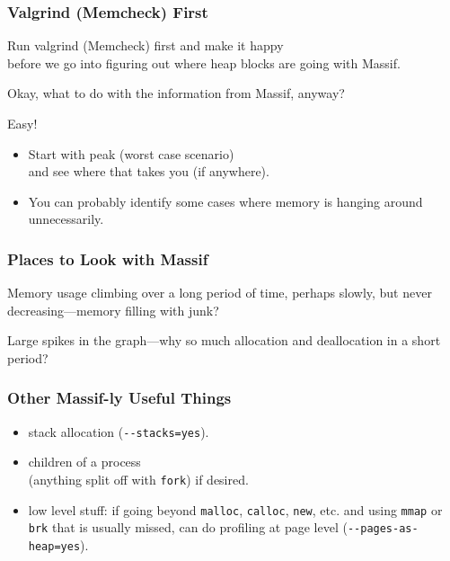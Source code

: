 \begin{frame}
\frametitle{Valgrind (Memcheck) First}

\large
\begin{changemargin}{2cm}
Run valgrind (Memcheck) first and make it happy \\
before we go into figuring out where heap blocks are going with Massif. 

Okay, what to do with the information from Massif, anyway? 

Easy!
\begin{itemize}
\item Start with peak (worst case scenario) \\ and see where that takes you (if anywhere). 

\item You can probably identify some cases where memory is hanging around unnecessarily. 
\end{itemize}
\end{changemargin}


\end{frame}


\begin{frame}
\frametitle{Places to Look with Massif}

\large
\begin{changemargin}{2cm}
Memory usage climbing over a long period of time, perhaps slowly, but never decreasing---memory filling with junk? 

Large spikes in the graph---why so much allocation and deallocation in a short period?
\end{changemargin}
\end{frame}



\begin{frame}[fragile]
\frametitle{Other Massif-ly Useful Things}

\large
\begin{changemargin}{2cm}
\begin{itemize}
	\item stack allocation (\verb+--stacks=yes+).
	\item children of a process \\ (anything split off with \texttt{fork}) if desired.
	\item low level stuff: if going beyond \texttt{malloc}, \texttt{calloc}, \texttt{new}, etc. and using \texttt{mmap} or \texttt{brk} that is usually missed, can do profiling at page level (\verb+--pages-as-heap=yes+).
\end{itemize}
\end{changemargin}

\end{frame}




